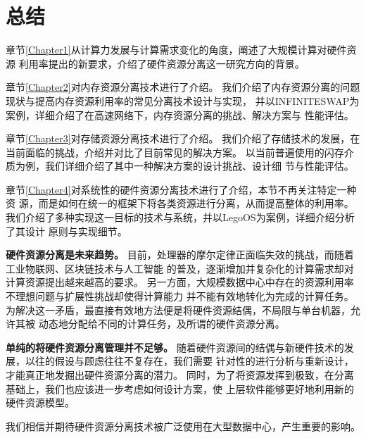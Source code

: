 \chapter{总结} %

\label{Chapter5} %

章节\ref{Chapter1}从计算力发展与计算需求变化的角度，阐述了大规模计算对硬件资源
利用率提出的新要求，介绍了硬件资源分离这一研究方向的背景。

章节\ref{Chapter2}对内存资源分离技术进行了介绍。
我们介绍了内存资源分离的问题现状与提高内存资源利用率的常见分离技术设计与实现，
并以INFINITESWAP为案例，详细介绍了在高速网络下，内存资源分离的挑战、解决方案与
性能评估。

章节\ref{Chapter3}对存储资源分离技术进行了介绍。
我们介绍了存储技术的发展，在当前面临的挑战，介绍并对比了目前常见的解决方案。
以当前普遍使用的闪存介质为例，我们详细介绍了其中一种解决方案的设计挑战、设计细
节与性能评估。

章节\ref{Chapter4}对系统性的硬件资源分离技术进行了介绍，本节不再关注特定一种资
源，而是如何在统一的框架下将各类资源进行分离，从而提高整体的利用率。
我们介绍了多种实现这一目标的技术与系统，并以LegoOS为案例，详细介绍分析了其设计
原则与实现细节。

\textbf{硬件资源分离是未来趋势。}
目前，处理器的摩尔定律正面临失效的挑战，而随着工业物联网、区块链技术与人工智能
的普及，逐渐增加并复杂化的计算需求却对计算资源提出越来越高的要求。
另一方面，大规模数据中心中存在的资源利用率不理想问题与扩展性挑战却使得计算能力
并不能有效地转化为完成的计算任务。
为解决这一矛盾，最直接有效地方法便是将硬件资源结偶，不局限与单台机器，允许其被
动态地分配给不同的计算任务，及所谓的硬件资源分离。

\textbf{单纯的将硬件资源分离管理并不足够。}
随着硬件资源间的结偶与新硬件技术的发展，以往的假设与顾虑往往不复存在，我们需要
针对性的进行分析与重新设计，才能真正地发掘出硬件资源分离的潜力。
同时，为了将资源发挥到极致，在分离基础上，我们也应该进一步考虑如何设计方案，使
上层软件能够更好地利用新的硬件资源模型。

我们相信并期待硬件资源分离技术被广泛使用在大型数据中心，产生重要的影响。